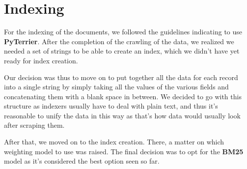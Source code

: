 \section{Indexing}

For the indexing of the documents, we followed the guidelines indicating to use \textbf{PyTerrier}. After the completion of the crawling of the data, we realized we needed a set of strings to be able to create an index, which we didn't have yet ready for index creation.

Our decision was thus to move on to put together all the data for each record into a single string by simply taking all the values of the various fields and concatenating them with a blank space in between. We decided to go with this structure as indexers usually have to deal with plain text, and thus it's reasonable to unify the data in this way as that's how data would usually look after scraping them.

After that, we moved on to the index creation. There, a matter on which weighting model to use was raised. The final decision was to opt for the \textbf{BM25} model as it's considered the best option seen so far.